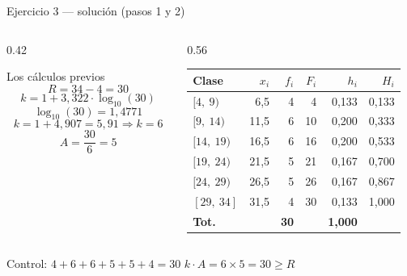 \documentclass[aspectratio=169,10pt]{beamer}
\begin{document}
\begin{frame}{Ejercicio 3 — solución (pasos 1 y 2)}
  \footnotesize
  \begin{columns}[T,onlytextwidth]
    \begin{column}{0.42\textwidth}
      \begin{block}{Los cálculos previos}
        \scriptsize
        \[ R = 34 - 4 = 30 \]
        \[ k = 1+3{,}322\cdot\log_{10}(30) \]
        \[ \log_{10}(30) = 1{,}4771 \]
        \[ k = 1+4{,}907 = 5{,}91 \Rightarrow k=6 \]
        \[ A = \frac{30}{6} = 5 \]
      \end{block}
    \end{column}
    \begin{column}{0.56\textwidth}
      \centering\scriptsize
      \begin{tabular}{@{}lrrrrr@{}}
        \toprule
        \textbf{Clase} & \textbf{$x_i$} & \textbf{$f_i$} & \textbf{$F_i$} &
        \textbf{$h_i$} & \textbf{$H_i$} \\
        \midrule
        $[4,\ 9)$   &  6{,}5 & 4 &  4 & 0{,}133 & 0{,}133 \\
        $[9,\ 14)$  & 11{,}5 & 6 & 10 & 0{,}200 & 0{,}333 \\
        $[14,\ 19)$ & 16{,}5 & 6 & 16 & 0{,}200 & 0{,}533 \\
        $[19,\ 24)$ & 21{,}5 & 5 & 21 & 0{,}167 & 0{,}700 \\
        $[24,\ 29)$ & 26{,}5 & 5 & 26 & 0{,}167 & 0{,}867 \\
        $[29,\ 34]$ & 31{,}5 & 4 & 30 & 0{,}133 & 1{,}000 \\
        \midrule
        \textbf{Tot.} & & \textbf{30} & & \textbf{1{,}000} & \\
        \bottomrule
      \end{tabular}
    \end{column}
  \end{columns}

  \vspace{0.2cm}
  {\scriptsize\color{uniGris} Control: $4+6+6+5+5+4=30$ \checkmark \quad
  $k\cdot A = 6\times 5 = 30 \ge R$ \checkmark}
\end{frame}
\end{document}
